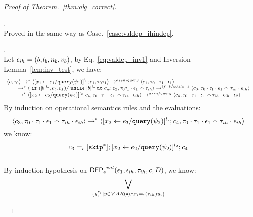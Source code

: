\begin{proof}[Proof of Theorem.~\ref{thm:alg_correct}]
\begin{case}
\begin{subcase}
\begin{subsubcase}
\begin{subsubsubcase}.
\\
Proved in the same way as Case.~\ref{case:valdep_ihindep}.
\end{subsubsubcase}
\begin{subsubsubcase}.
\\
Let $\mathtt{\epsilon}_{ih} = (b, l_b, n_b, v_b)$, by Eq.~\ref{eq:valdep_inv1} and {Inversion Lemma~\ref{lem:inv_test}}, we have:
\begin{equation}
\label{eq:m1test_inv1}
  \begin{array}{l}   
\langle {c}, \mathtt{\tau}_0 \rangle \rightarrow^{*} 
\langle [\mathrel{ {x}_1 \leftarrow e_1 / {\tt query}(\psi_1) }]^{l_1} ; {c}_1, \mathtt{\tau}_0 \mathtt{\tau}_1 \rangle  
\rightarrow^{assn/query}
 \langle c_1, \mathtt{\tau}_0 \cdot \mathtt{\tau}_1 \cdot \mathtt{\epsilon}_1 \rangle 
 \\
  \qquad \rightarrow^{*} 
  \langle \;\mathtt{if}\; ([b]^{l_b}, c_t, c_f) / \;\mathtt{while}\; [b]^{l_b} \;\mathtt{do}\; c_w;{c}_2, 
  \mathtt{\tau}_0 \mathtt{\tau}_1 \cdot \mathtt{\epsilon}_1 \smallfrown \mathtt{\tau}_{ih} \rangle 
 \rightarrow^{if-b / while-b} 
  \langle c_3, 
  \mathtt{\tau}_0 \cdot \mathtt{\tau}_1 \cdot \mathtt{\epsilon}_1 \smallfrown \mathtt{\tau}_{ih} \cdot \mathtt{\epsilon}_{ih} \rangle 
  \\
  \qquad   \rightarrow^{*} 
  \langle [\mathrel{ {x}_2 \leftarrow e_2 / {\tt query}(\psi_2) }]^{l_2};{c}_4, 
  \mathtt{\tau}_0 \cdot \mathtt{\tau}_1 \cdot \mathtt{\epsilon}_1 \smallfrown \mathtt{\tau}_{ih} \cdot \mathtt{\epsilon}_{ih} \rangle 
  \rightarrow^{assn/query} 
  \langle {c}_4,  \mathtt{\tau}_0 \cdot \mathtt{\tau}_1 \cdot \mathtt{\epsilon}_1  \smallfrown \mathtt{\tau}_{ih} \cdot \mathtt{\epsilon}_{ih} \cdot \mathtt{\epsilon}_2 \rangle 
\end{array}
\end{equation}
 By induction on operational semantics rules and the evaluations: 
 \[
 \langle c_3, 
  \mathtt{\tau}_0 \cdot \mathtt{\tau}_1 \cdot \mathtt{\epsilon}_1 \smallfrown \mathtt{\tau}_{ih} \cdot \mathtt{\epsilon}_{ih} \rangle 
  \rightarrow^{*} 
  \langle [\mathrel{ {x}_2 \leftarrow e_2 / {\tt query}(\psi_2) }]^{l_2};{c}_4, 
  \mathtt{\tau}_0 \cdot \mathtt{\tau}_1 \cdot \mathtt{\epsilon}_1 \smallfrown \mathtt{\tau}_{ih} \cdot \mathtt{\epsilon}_{ih} \rangle 
 \]
 we know:
  \[
 c_3 =_c 
 [\mathtt{skip}^*]; [\mathrel{ {x}_2 \leftarrow e_2 / {\tt query}(\psi_2) }]^{l_2};{c}_4
 \]
\label{case:valdep_ihtestdep}
\\
%
By induction hypothesis on $\mathsf{DEP_{\mathtt{e}}}^{val}(\mathtt{\epsilon}_1, \mathtt{\epsilon}_{ih}, \mathtt{\tau}_{ih}, c, D)$, we know:
%
\begin{equation}
\label{eq:valdep_ihtestb}
  \bigvee_{\{y_i^{r_i} \vert y \in VAR(b) \land r_i = \llabel(\trace_{ih}) y_i\}}

\end{equation}
\end{subsubsubcase}
\end{subsubcase}
\end{subcase}
\end{case}
\end{proof}
